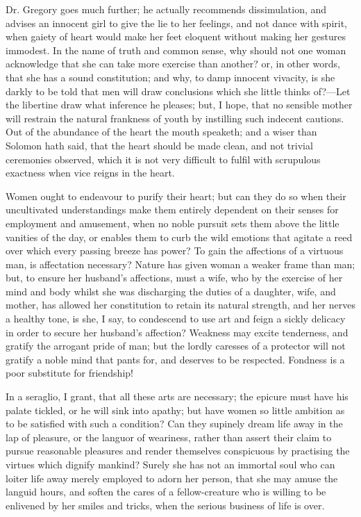 Dr. Gregory goes much further; he actually recommends dissimulation,
and advises an innocent girl to give the lie to her feelings, and not
dance with spirit, when gaiety of  heart would make her feet
eloquent without making her gestures immodest. In the name of truth
and common sense, why should not one woman acknowledge that she can
take more exercise than another? or, in other words, that she has a
sound constitution; and why, to damp innocent vivacity, is she darkly
to be told that men will draw conclusions which she little thinks
of?---Let the libertine draw what inference he pleases; but, I hope,
that no sensible mother will restrain the natural frankness of youth
by instilling such indecent cautions. Out of the abundance of the
heart the mouth speaketh; and a wiser than Solomon hath said, that the
heart should be made clean, and not trivial ceremonies observed, which
it is not very difficult to fulfil with scrupulous exactness when vice
reigns in the heart.

Women ought to endeavour to purify their heart; but can they do so
when their uncultivated understandings make them entirely dependent on
their senses for employment and amusement, when no noble pursuit sets
them above the little vanities of the day, or enables them to curb the
wild emotions that agitate a reed over which every passing breeze has
 power? To gain the affections of a virtuous man, is
affectation necessary? Nature has given woman a weaker frame than man;
but, to ensure her husband's affections, must a wife, who by the
exercise of her mind and body whilst she was discharging the duties of
a daughter, wife, and mother, has allowed her constitution to retain
its natural strength, and her nerves a healthy tone, is she, I say, to
condescend to use art and feign a sickly delicacy in order to secure
her husband's affection? Weakness may excite tenderness, and gratify
the arrogant pride of man; but the lordly caresses of a protector will
not gratify a noble mind that pants for, and deserves to be respected.
Fondness is a poor substitute for friendship!

In a seraglio, I grant, that all these arts are necessary; the epicure
must have his palate tickled, or he will sink into apathy; but have
women so little ambition as to be satisfied with such a condition? Can
they supinely dream life away in the lap of pleasure, or the languor
of weariness, rather than assert their claim to pursue reasonable
pleasures and render themselves conspicuous by practising the virtues
which dignify mankind? Surely she has not an immortal soul who can
loiter life away  merely employed to adorn her person, that
she may amuse the languid hours, and soften the cares of a
fellow-creature who is willing to be enlivened by her smiles and
tricks, when the serious business of life is over.

